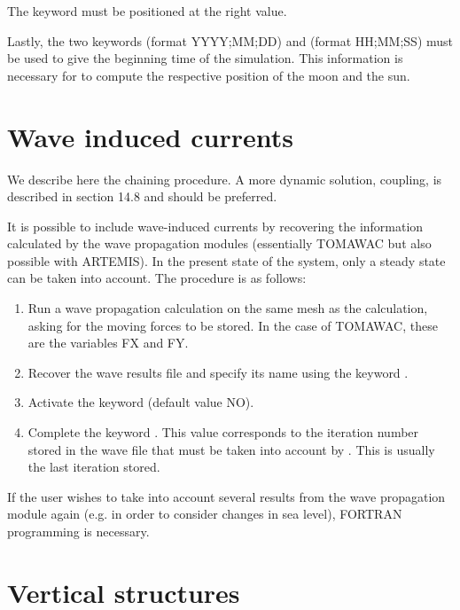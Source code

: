  The keyword   must be positioned at the right value.

 Lastly, the two keywords  (format YYYY;MM;DD) and   (format HH;MM;SS) must be used to give the beginning time of the simulation. This information is necessary for  to compute the respective position of the moon and the sun.


\section{Wave induced currents}

 We describe here the chaining procedure.  A more dynamic solution, coupling, is described in section 14.8 and should be preferred.

 It is possible to include wave-induced currents by recovering the information calculated by the wave propagation modules (essentially TOMAWAC but also possible with ARTEMIS). In the present state of the system, only a steady state can be taken into account. The procedure is as follows:

\begin{enumerate}
\item  Run a wave propagation calculation on the same mesh as the  calculation, asking for the moving forces to be stored. In the case of TOMAWAC, these are the variables FX and FY.

\item  Recover the wave results file and specify its name using the keyword .

\item  Activate the keyword  (default value NO).

\item  Complete the keyword . This value corresponds to the iteration number stored in the wave file that must be taken into account by . This is usually the last iteration stored.
\end{enumerate}

 If the user wishes to take into account several results from the wave propagation module again (e.g. in order to consider changes in sea level), FORTRAN programming is necessary.


\section{ Vertical structures }

